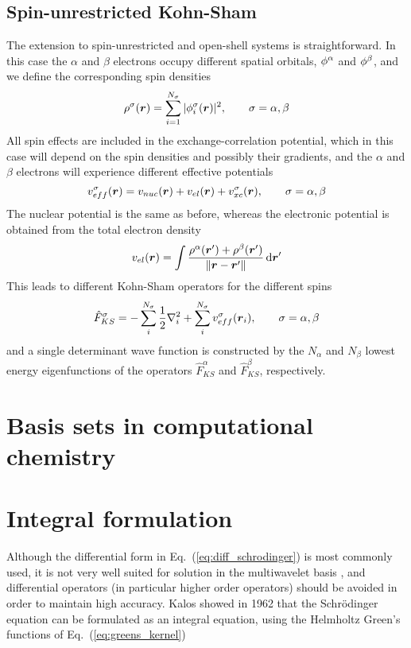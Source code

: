 \subsection{Spin-unrestricted Kohn-Sham}
The extension to spin-unrestricted and open-shell systems is straightforward. In this case the
$\alpha$ and $\beta$ electrons occupy different spatial orbitals, $\phi^\alpha$ and 
$\phi^\beta$, and we define the corresponding spin densities
\begin{equation}
    \rho^{\sigma}(\boldsymbol r) = 
	\sum_{i=1}^{N_{\sigma}} |\phi_i^{\sigma}(\boldsymbol r)|^2, \qquad \sigma = \alpha, \beta
\end{equation}
All spin effects are included in the exchange-correlation potential, which in this case will 
depend on the spin densities and possibly their gradients, and the $\alpha$ and $\beta$ electrons 
will experience different effective potentials
\begin{equation}
    v_{eff}^{\sigma} (\boldsymbol r) = 
	v_{nuc}(\boldsymbol r) + v_{el}(\boldsymbol r) + v_{xc}^{\sigma}(\boldsymbol r), \qquad \sigma = \alpha, \beta
\end{equation}
The nuclear potential is the same as before, whereas the electronic potential is obtained
from the total electron density
\begin{equation}
    v_{el}(\boldsymbol r) = \int \frac{\rho^\alpha(\boldsymbol r') + \rho^\beta(\boldsymbol r')}
	{\|\boldsymbol r-\boldsymbol r'\|} \,\mathrm{d} \boldsymbol r'
\end{equation}
This leads to different Kohn-Sham operators for the different spins
\begin{equation}
    \hat{F}_{KS}^\sigma = -\sum_i^{N_\sigma} \frac{1}{2}\nabla_i^2 + 
	\sum_i^{N_\sigma} v_{eff}^\sigma(\boldsymbol r_i), \qquad \sigma = \alpha, \beta
\end{equation}
and a single determinant wave function is constructed by the $N_\alpha$ and $N_\beta$ 
lowest energy eigenfunctions of the operators $\hat{F}_{KS}^\alpha$ and 
$\hat{F}_{KS}^\beta$, respectively.

\section{Basis sets in computational chemistry}

\section{Integral formulation}
Although the differential form in Eq.~(\ref{eq:diff_schrodinger}) is most 
commonly used, it is not very well suited for solution in the multiwavelet 
basis \cite{Harrison}, and differential operators (in particular higher 
order operators) should be avoided in order to maintain high accuracy. 
Kalos \cite{Kalos} showed in 1962 that the Schr\"{o}dinger equation can 
be formulated as an integral equation, using the Helmholtz Green's functions 
of Eq.~(\ref{eq:greens_kernel})

